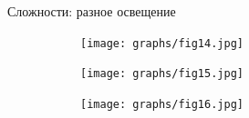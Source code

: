 \documentclass[aspectratio=169]{beamer}
\begin{document}
\begin{frame}{Сложности: разное освещение}
    \begin{figure}
        \begin{subfigure}[b]{0.3\linewidth}
            \texttt{[image: graphs/fig14.jpg]}
        \end{subfigure}
        \begin{subfigure}[b]{0.3\linewidth}
            \texttt{[image: graphs/fig15.jpg]}
        \end{subfigure}
        \begin{subfigure}[b]{0.3\linewidth}
            \texttt{[image: graphs/fig16.jpg]}
        \end{subfigure}
    \end{figure}
\end{frame}
\end{document}
